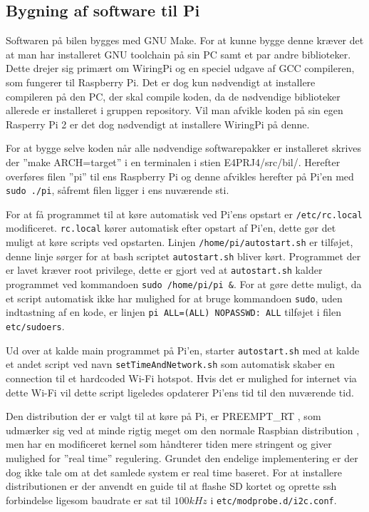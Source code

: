 \subsection{Bygning af software til Pi}

Softwaren på bilen bygges med GNU Make\cite{lib:GNU_make}.
For at kunne bygge denne kræver det at man har installeret GNU toolchain på sin PC samt et par andre biblioteker.
Dette drejer sig primært om WiringPi\cite{lib:wiringpi} og en speciel udgave af GCC compileren, som fungerer til Raspberry Pi\cite{lib:pi_tools}.
Det er dog kun nødvendigt at installere compileren på den PC, der skal compile koden, da de nødvendige biblioteker allerede er installeret i gruppen repository. 
Vil man afvikle koden på sin egen Rasperry Pi 2 er det dog nødvendigt at installere WiringPi \cite{lib:wiringpi_projekt} på denne. %

For at bygge selve koden når alle nødvendige softwarepakker er installeret skrives der ''make ARCH=target'' i en terminalen i stien E4PRJ4/src/bil/.
Herefter overføres filen ''pi'' til ens Raspberry Pi og denne afvikles herefter på Pi'en med \texttt{sudo ./pi}, såfremt filen ligger i ens nuværende sti.

For at få programmet til at køre automatisk ved Pi'ens opstart er \texttt{/etc/rc.local} modificeret. \texttt{rc.local} kører automatisk efter opstart af Pi'en, dette gør det muligt at køre scripts ved opstarten. Linjen \texttt{/home/pi/autostart.sh} er tilføjet, denne linje sørger for at bash scriptet \texttt{autostart.sh} bliver kørt. Programmet der er lavet kræver root privilege, dette er gjort ved at \texttt{autostart.sh} kalder programmet ved kommandoen \texttt{sudo /home/pi/pi \&}.
For at gøre dette muligt, da et script automatisk ikke har mulighed for at bruge kommandoen \texttt{sudo}, uden indtastning af en kode, er linjen \texttt{pi ALL=(ALL) NOPASSWD: ALL} tilføjet i filen \texttt{etc/sudoers}.

Ud over at kalde main programmet på Pi'en, starter \texttt{autostart.sh} med at kalde et andet script ved navn \texttt{setTimeAndNetwork.sh} som automatisk skaber en connection til et hardcoded Wi-Fi hotspot. Hvis det er mulighed for internet via dette Wi-Fi vil dette script ligeledes opdaterer Pi'ens tid til den nuværende tid.

Den distribution der er valgt til at køre på Pi, er PREEMPT\_RT \cite{lib:PREEMPT_RT}, som udmærker sig ved at minde rigtig meget om den normale Raspbian distribution \cite{lib:raspbian}, men har en modificeret kernel som håndterer tiden mere stringent og giver mulighed for ''real time'' regulering. Grundet den endelige implementering er der dog ikke tale om at det samlede system er real time baseret. For at installere distributionen er der anvendt en guide til at flashe SD kortet \cite{lib:rpi_sd} og oprette ssh forbindelse \cite{lib:ssh} ligesom \IIC baudrate er sat til $100kHz$ i \texttt{etc/modprobe.d/i2c.conf}.


